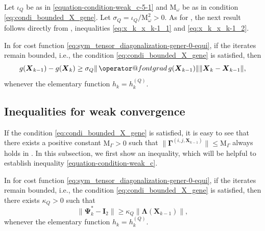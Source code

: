 \documentclass[final,onefignum,onetabnum]{siamart190516}
\makeatletter
\newcommand{\matr}[1]{\boldsymbol{#1}}
\newcommand{\ProjGrad}[2]{\mathop{{\operator@font grad} }#1(#2)}
\newcommand{\Utwo}{\Psi}
\newcommand{\Gamij}[3]{\matr{\Gamma}^{(#1,#2,#3)}}
\makeatother
\begin{document}
Let $\iota_{Q}$ be as in \cref{equation-condition-weak_c-5-1} and $\mathrm{M}_{\omega}$ be as in condition  \cref{eq:condi_bounded_X_gene}. 
Let $\sigma_{Q}=\iota_{Q}/\mathrm{M}_{\omega}^2>0$. 
As for , the next result follows directly from , inequalities \cref{eq:x_k_x_k-1_1} and \cref{eq:x_k_x_k-1_2}.

\begin{corollary}\label{lemma:h_k_condition_SU}
In  for cost function \cref{eq:sym_tensor_diagonalization-gener-0-equi},
if the iterates remain bounded, i.e., the condition \cref{eq:condi_bounded_X_gene} is satisfied,
then 
\begin{equation*}
g(\matr{X}_{k-1})-g(\matr{X}_{k})\geq\sigma_{Q}\|\ProjGrad{g}{\matr{X}_{k-1}}\|\|\matr{X}_{k}-\matr{X}_{k-1}\|,
\end{equation*}
whenever the elementary function $h_k=h^{(Q)}_{k}$. 
\end{corollary}

\subsection{Inequalities for weak convergence}
If the condition \cref{eq:condi_bounded_X_gene} is satisfied, it is easy to see that there exists a positive constant  $\mathrm{M}_{\Gamma}>0$ such that $\|\Gamij{i}{j}{\matr{X}_{k-1}}\|\leq \mathrm{M}_{\Gamma}$ always holds in . 
In this subsection, we first show an inequality, which will be helpful to establish inequality \cref{equation-condition-weak_c}. 

\begin{lemma}\label{lemma:weak_rho_inequality_c-3}
In  for cost function \cref{eq:sym_tensor_diagonalization-gener-0-equi},
if the iterates remain bounded, i.e., the condition \cref{eq:condi_bounded_X_gene} is satisfied, then there exists $\kappa_{Q}>0$ such that 
\begin{equation}\label{equation-condition-weak_c-4-3}
\|\matr{\Utwo}^{*}_{k}-\matr{I}_{2}\|\geq	\kappa_{Q}\|\matr{\Lambda}(\matr{X}_{k-1})\|,
\end{equation}
whenever the elementary function $h_k=h^{(Q)}_{k}$. 
\end{lemma}
\end{document}
